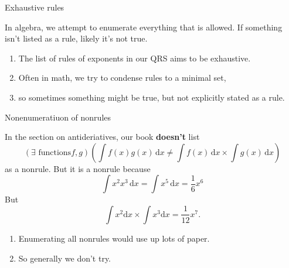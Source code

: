 \documentclass[portrait,fleqn,12pt]{beamer}
\newenvironment{handlist}
   {\begin{enumerate}[\faHandPointRight]
       \addtolength{\itemsep}{0.0\itemsep}}
     {\end{enumerate}}
\begin{document}
\begin{frame}{Exhaustive rules}

In algebra, we attempt to enumerate everything that is allowed. If something isn't listed as a rule, likely it's not true.

\begin{handlist}
\item The list of rules of exponents in our QRS aims to be exhaustive.

\item  Often in math, we try  to condense rules to a minimal set, 

\item so sometimes something might be true, but not explicitly stated as a rule.
\end{handlist}

\end{frame}

\begin{frame}{Nonenumeratiuon of nonrules}

In the section on antideriatives, our book \textbf{doesn't} list
\begin{equation*}
 \left(\exists \text{ functions} f,g \right) \left(
    \int f(x) g(x) \, \mathrm{d} x \neq  \int f(x) \, \mathrm{d} x 
     \times \int g(x) \, \mathrm{d} x \right)
\end{equation*}
as a nonrule. But it is a nonrule because 
\begin{equation*}
  \int x^2 x^3 \, \mathrm{d} x = \int x^5 \, \mathrm{d} x = \frac{1}{6} x^6
\end{equation*}
But
\begin{equation*}
  \int x^2 \mathrm{d} x \times \int x^3 \mathrm{d} x  = \frac{1}{12} x^7.
\end{equation*}

\begin{handlist}
\item Enumerating all nonrules would use up lots of paper.
\item So generally we don't try.
\end{handlist}
  
\end{frame}
\end{document}
